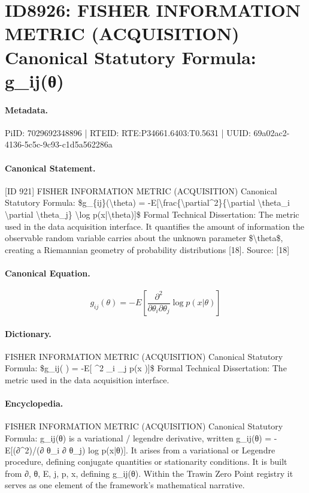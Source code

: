 \section*{ID8926: FISHER INFORMATION METRIC (ACQUISITION) Canonical Statutory Formula: g\_ij(θ)}
\paragraph{Metadata.}
PiID: 7029692348896 | RTEID: RTE:P34661.6403:T0.5631 | UUID: 69a02ac2-4136-5c5c-9c93-c1d5a562286a

\paragraph{Canonical Statement.}
[ID 921] FISHER INFORMATION METRIC (ACQUISITION) Canonical Statutory Formula: \$g\_\{ij\}(\textbackslash{}theta) = -E[\textbackslash{}frac\{\textbackslash{}partial\textasciicircum{}2\}\{\textbackslash{}partial \textbackslash{}theta\_i \textbackslash{}partial \textbackslash{}theta\_j\} \textbackslash{}log p(x|\textbackslash{}theta)]\$ Formal Technical Dissertation: The metric used in the data acquisition interface. It quantifies the amount of information the observable random variable carries about the unknown parameter \$\textbackslash{}theta\$, creating a Riemannian geometry of probability distributions [18]. Source: [18]

\paragraph{Canonical Equation.}
\[
g_{ij}(\theta) = -E[\frac{\partial^2}{\partial \theta_i \partial \theta_j} \log p(x|\theta)]
\]

\paragraph{Dictionary.}
FISHER INFORMATION METRIC (ACQUISITION) Canonical Statutory Formula: \$g\_ij( ) = -E[ \textasciicircum{}2 \_i \_j p(x )]\$ Formal Technical Dissertation: The metric used in the data acquisition interface.

\paragraph{Encyclopedia.}
FISHER INFORMATION METRIC (ACQUISITION) Canonical Statutory Formula: g\_ij(θ) is a variational / legendre derivative, written g\_ij(θ) = -E[(∂\textasciicircum{}2)/(∂ θ\_i ∂ θ\_j) log p(x|θ)]. It arises from a variational or Legendre procedure, defining conjugate quantities or stationarity conditions. It is built from ∂, θ, E, j, p, x, defining g\_ij(θ). Within the Trawin Zero Point registry it serves as one element of the framework's mathematical narrative.
